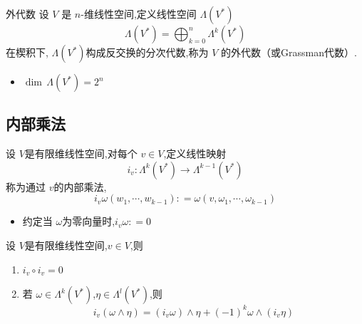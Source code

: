 \documentclass[../../几何与拓扑.tex]{subfiles}
\begin{document}
\begin{definition}{外代数}
设 $ V $ 是 $ n $-维线性空间,定义线性空间 $  \Lambda \left( V^{*} \right)  $ $$
 \Lambda \left( V^{*} \right) =  \bigoplus_{k=0}^{n}  \Lambda ^{k}\left( V^{*} \right)  
$$  在楔积下, $  \Lambda \left( V^{*} \right)  $构成反交换的分次代数,称为 $ V $ 的外代数（或Grassman代数）. 
\end{definition}

\begin{remark}
    \begin{itemize}
        \item $ \operatorname{dim} \,\Lambda \left( V^{*} \right) = 2^{n}  $ 
    \end{itemize}
    
\end{remark}

\subsection{内部乘法}

\begin{definition}
    设 $ V $是有限维线性空间,对每个 $ v\in V $,定义线性映射 $$
    i_{v}:  \Lambda ^{k}\left( V^{*} \right)\to  \Lambda ^{k-1}\left( V^{*} \right)  
    $$称为通过 $ v $的内部乘法, $$
    i_{v} \omega \left( w_1,\cdots ,w_{k-1} \right) : =  \omega \left( v, \omega _{1},\cdots , \omega _{k-1} \right)  
    $$   
\end{definition}

\begin{remark}
    \begin{itemize}
        \item 约定当 $  \omega  $为零向量时,$ i_{v} \omega: =0 $  
    \end{itemize}
\end{remark}

\begin{lemma}\label{Int-Multy-lemma}
    设 $ V $是有限维线性空间,$ v \in V $,则 
    \begin{enumerate}
        \item $ i_{v}\circ i_{v}= 0 $
        \item 若 $  \omega \in  \Lambda ^{k}\left( V^{*} \right)  $,$ \eta  \in  \Lambda ^{l}\left( V^{*} \right)  $,则 $$
        i_{v}\left(  \omega \wedge \eta  \right)= \left( i_{v} \omega  \right)\wedge \eta + \left( -1 \right)^{k} \omega \wedge \left( i_{v}\eta  \right)    
        $$   
    \end{enumerate}
      
\end{lemma}
\end{document}
